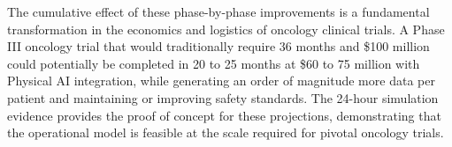 The cumulative effect of these phase-by-phase improvements is a fundamental
transformation in the economics and logistics of oncology clinical trials.
A Phase III oncology trial that would traditionally require 36 months and
\$100 million could potentially be completed in 20 to 25 months at \$60 to
75 million with Physical AI integration, while generating an order of
magnitude more data per patient and maintaining or improving safety standards.
The 24-hour simulation evidence \cite{site-docs} provides the proof of
concept for these projections, demonstrating that the operational model is
feasible at the scale required for pivotal oncology trials.

